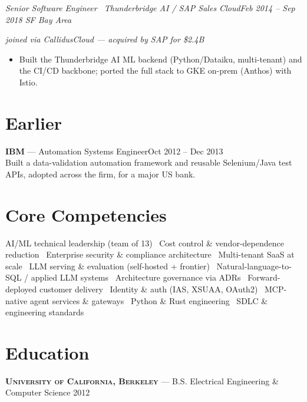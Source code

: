 \documentclass[10pt,letterpaper]{article}
\newcommand{\entrygap}{1pt}
\newcommand{\role}[2]{{\itshape #1}\hfill{\itshape #2}\par\vspace{1.5pt}}
\begin{document}
\role{Senior Software Engineer \textbar\ Thunderbridge AI / SAP Sales Cloud}{Feb 2014 -- Sep 2018 \;\textbullet\; SF Bay Area}
{\small\itshape joined via CallidusCloud --- acquired by SAP for \$2.4B}\par\vspace{1.5pt}
\begin{itemize}
  \item Built the Thunderbridge AI ML backend (Python/Dataiku, multi-tenant) and the CI/CD backbone;
  ported the full stack to GKE on-prem (Anthos) with Istio.
\end{itemize}

\vspace{\entrygap}
\section{Earlier}
{\scshape\bfseries IBM} \textnormal{--- Automation Systems Engineer}\hfill Oct 2012 -- Dec 2013\\[1pt]
Built a data-validation automation framework and reusable Selenium/Java test APIs, adopted across the
firm, for a major US bank.

\section{Core Competencies}
{\small
AI/ML technical leadership (team of 13) \textbullet\ Cost control \& vendor-dependence reduction
\textbullet\ Enterprise security \& compliance architecture \textbullet\ Multi-tenant SaaS at scale
\textbullet\ LLM serving \& evaluation (self-hosted + frontier) \textbullet\ Natural-language-to-SQL /
applied LLM systems \textbullet\ Architecture governance via ADRs \textbullet\ Forward-deployed customer
delivery \textbullet\ Identity \& auth (IAS, XSUAA, OAuth2) \textbullet\ MCP-native agent services \&
gateways \textbullet\ Python \& Rust engineering \textbullet\ SDLC \& engineering standards\par}

\section{Education}
{\scshape\bfseries University of California, Berkeley} --- B.S. Electrical Engineering \& Computer Science \hfill 2012
\end{document}
